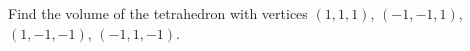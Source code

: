 \begin{example}
Find the volume of the tetrahedron with vertices $(1,1,1)$, $(-1,-1,1)$, $(1,-1,-1)$, $(-1,1,-1)$. 

\end{example}